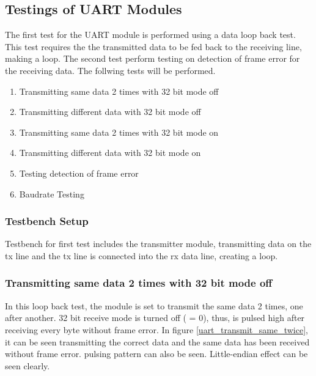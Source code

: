 \subsection{Testings of UART Modules}
The first test for the UART module is performed using a data loop back test. This test requires the the transmitted data to be fed back to the receiving line, making a loop. The second test perform testing on detection of frame error for the receiving data. The follwing tests will be performed.

\begin{enumerate}
	\item Transmitting same data 2 times with 32 bit mode off
	\item Transmitting different data with 32 bit mode off
	\item Transmitting same data 2 times with 32 bit mode on
	\item Transmitting different data with 32 bit mode on
	\item Testing detection of frame error
	\item Baudrate Testing
\end{enumerate}

\subsubsection{Testbench Setup}
Testbench for first test includes the transmitter module, transmitting data on the tx line and the tx line is connected into the rx data line, creating a loop. 



\newpage
\subsubsection{Transmitting same data 2 times with 32 bit mode off}
In this loop back test, the module is set to transmit the same data 2 times, one after another. 32 bit receive mode is turned off ( = 0), thus,  is pulsed high after receiving every byte without frame error. In figure \ref{uart_transmit_same_twice}, it can be seen transmitting the correct data and the same data has been received without frame error.  pulsing pattern can also be seen. Little-endian effect can be seen clearly.


